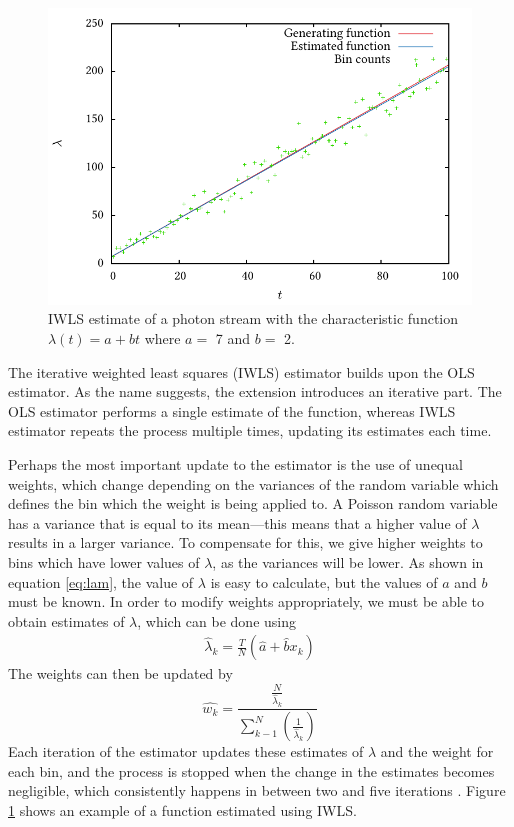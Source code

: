 \documentclass[a4paper,11pt]{article}
\begin{document}
    \begin{figure}[h]
    \includegraphics{images/lineest}
    \caption{IWLS estimate of a photon stream with the characteristic function
    $\lambda(t)=a+bt$ where $a=$ 7 and $b=$ 2.}
    \label{linefig}
    \end{figure}
    The iterative weighted least squares (IWLS) estimator builds upon the OLS
    estimator. As the name suggests, the extension introduces an iterative
    part. The OLS estimator performs a single estimate of the function, whereas
    IWLS estimator repeats the process multiple times, updating its estimates
    each time.

    Perhaps the most important update to the estimator is the use of unequal
    weights, which change depending on the variances of the random variable
    which defines the bin which the weight is being applied to. A Poisson random
    variable has a variance that is equal to its mean---this means that a higher
    value of $\lambda$ results in a larger variance. To compensate for this,
    we give higher weights to bins which have lower values of $\lambda$, as the
    variances will be lower. As shown in equation \eqref{eq:lam}, the value of
    $\lambda$ is easy to calculate, but the values of $a$ and $b$ must be
    known. In order to modify weights appropriately, we must be able to obtain
    estimates of $\lambda$, which can be done using \cite{massey1996estimating}
    \begin{align}
    \hat{\lambda}_k=\frac{T}{N}(\hat{a}+\hat{b}x_k)
    \end{align}
    The weights can then be updated by
    \begin{equation}
    \hat{w_k}=\frac{\displaystyle \frac{N}{\hat{\lambda}_k}}{\displaystyle \sum_{k-1}^N\left(\frac{1}{\hat{\lambda}_k}\right)}
    \end{equation}
    Each iteration of the estimator updates these estimates of $\lambda$ and the
    weight for each bin, and the process is stopped when the change in the
    estimates becomes negligible, which consistently happens in between two and
    five iterations \cite{massey1996estimating}. Figure \ref{linefig} shows an
    example of a function estimated using IWLS.
\end{document}
